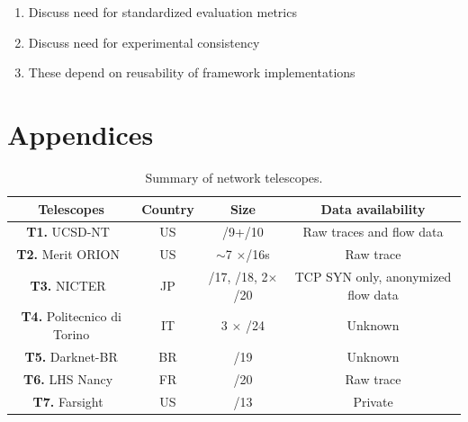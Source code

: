 \documentclass[manuscript,nonacm]{acmart}
\begin{document}
\begin{enumerate}
	\item Discuss need for standardized evaluation metrics
	\item Discuss need for experimental consistency
	\item These depend on reusability of framework implementations
\end{enumerate}


\section{Appendices}

\begin{table}[httb]
	\small
	\caption{Summary of network telescopes.}\label{tab:telescopes}
	\begin{tabular}{cccc}
		\toprule
		Telescopes & Country & Size & Data availability\\
		\midrule
		\textbf{T1.} UCSD-NT~\cite{caida2025ucsdnt} & US & /9+/10 & Raw traces and flow data \\
		\textbf{T2.} Merit ORION~\cite{orion} & US & $\sim$7 $\times$/16s & Raw trace\\
		\textbf{T3.} NICTER~\cite{nicter2025nt} & JP &  /17, /18, 2$\times$/20 & TCP SYN only, anonymized flow data\\
		\textbf{T4.} Politecnico di Torino \cite{2020soro} & IT & 3 $\times$ /24 & Unknown\\
		\textbf{T5.} Darknet-BR \cite{CunhaCamargo2025darknetbr} & BR & /19 & Unknown\\
		\textbf{T6.} LHS Nancy~\cite{inria2025nt} & FR & /20 & Raw trace\\
		\textbf{T7.} Farsight~\cite{@@} & US & /13 & Private\\
		\bottomrule
	\end{tabular}
\end{table}
\end{document}
